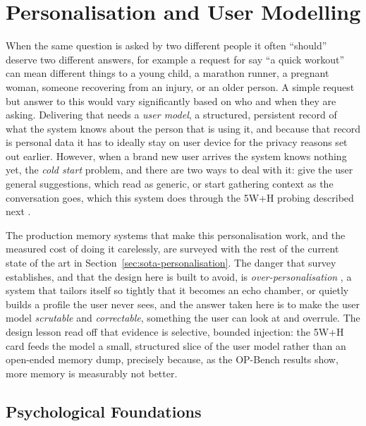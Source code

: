 \section{Personalisation and User Modelling}
\label{sec:personalisation-and-user-modelling}

When the same question is asked by two different people it often ``should'' deserve two different answers, for example a request for say ``a quick workout'' can mean different things to a young child, a marathon runner, a pregnant woman, someone recovering from an injury, or an older person. A simple request but answer to this would vary significantly based on who and when they are asking. Delivering that needs a \emph{user model}, a structured, persistent record of what the system knows about the person that is using it, and because that record is personal data it has to ideally stay on user device for the privacy reasons set out earlier. However, when a brand new user arrives the system knows nothing yet, the \emph{cold start} problem, and there are two ways to deal with it: give the user general suggestions, which read as generic, or start gathering context as the conversation goes, which this system does through the 5W+H probing described next \cite{akbar2024hitlpipa}.

The production memory systems that make this personalisation work, and the measured cost of doing it carelessly, are surveyed with the rest of the current state of the art in Section~\ref{sec:sota-personalisation}. The danger that survey establishes, and that the design here is built to avoid, is \emph{over-personalisation} \cite{spadea2025avoidingoverpersonalizationruleguidedknowledge, hu2026opbenchbenchmarkingoverpersonalizationmemoryaugmented}, a system that tailors itself so tightly that it becomes an echo chamber, or quietly builds a profile the user never sees, and the answer taken here is to make the user model \emph{scrutable} and \emph{correctable}, something the user can look at and overrule. The design lesson read off that evidence is selective, bounded injection: the 5W+H card feeds the model a small, structured slice of the user model rather than an open-ended memory dump, precisely because, as the OP-Bench results show, more memory is measurably not better.

\subsection{Psychological Foundations}
\label{subsec:psychological-foundations}

